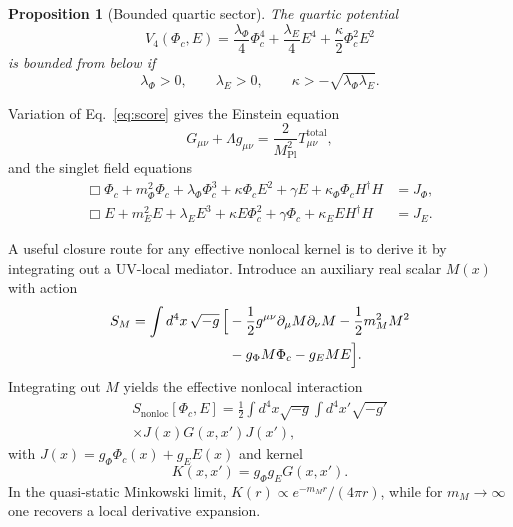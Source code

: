 \documentclass[aps,prd,twocolumn,superscriptaddress,nofootinbib]{revtex4-2}
\newtheorem{proposition}{Proposition}
\begin{document}
\begin{proposition}[Bounded quartic sector]
The quartic potential
\begin{equation}
V_4(\Phi_c,E)=\frac{\lambda_{\Phi}}{4}\Phi_c^4+\frac{\lambda_E}{4}E^4+\frac{\kappa}{2}\Phi_c^2E^2
\end{equation}
is bounded from below if
\begin{equation}
\lambda_{\Phi}>0,\qquad \lambda_E>0,\qquad \kappa> -\sqrt{\lambda_{\Phi}\lambda_E}.
\end{equation}
\end{proposition}

Variation of Eq.~\eqref{eq:score} gives the Einstein equation
\begin{equation}
G_{\mu\nu}+\Lambda g_{\mu\nu}=\frac{2}{M_{\mathrm{Pl}}^2}T^{\mathrm{total}}_{\mu\nu},
\end{equation}
and the singlet field equations
\begin{align}
\Box\Phi_c + m_{\Phi}^2\Phi_c + \lambda_{\Phi}\Phi_c^3 + \kappa\Phi_c E^2 + \gamma E + \kappa_{\Phi}\Phi_c H^{\dagger}H &= J_{\Phi},
\label{eq:phieom}\\
\Box E + m_E^2E + \lambda_E E^3 + \kappa E\Phi_c^2 + \gamma\Phi_c + \kappa_E E H^{\dagger}H &= J_E.
\label{eq:eeom}
\end{align}

A useful closure route for any effective nonlocal kernel is to derive it by integrating out a UV-local mediator. Introduce an auxiliary real scalar $M(x)$ with action
\begin{equation}
\begin{split}
S_M = \int d^4x\,\sqrt{-g}\,\Bigl[ &-\frac{1}{2}g^{\mu\nu}\partial_{\mu}M\partial_{\nu}M - \frac{1}{2}m_M^2M^2 \\
&- g_{\Phi}M\Phi_c - g_E M E\Bigr].
\end{split}
\end{equation}
Integrating out $M$ yields the effective nonlocal interaction
\begin{equation}
\begin{split}
S_{\mathrm{nonloc}}[\Phi_c,E] = \frac{1}{2}\int d^4x\sqrt{-g}\int d^4x'\sqrt{-g'} \\
\times J(x)G(x,x')J(x'),
\end{split}
\end{equation}
with $J(x)=g_{\Phi}\Phi_c(x)+g_EE(x)$ and kernel
\begin{equation}
K(x,x') = g_{\Phi}g_E G(x,x').
\end{equation}
In the quasi-static Minkowski limit, $K(r)\propto e^{-m_M r}/(4\pi r)$, while for $m_M\to\infty$ one recovers a local derivative expansion.
\end{document}

